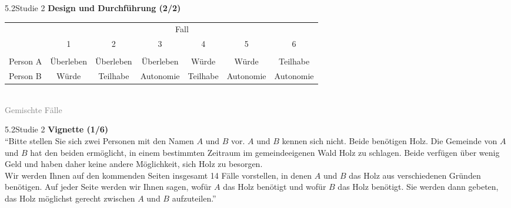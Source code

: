 \documentclass[xcolor=table,9pt,aspectratio=169]{beamer}
\begin{document}
\begin{frame}{\vspace*{10mm}5.2\hspace*{1em}Studie 2}
\textbf{Design und Durchführung (2/2)}\\
\medskip
\begin{center}
   \begin{tabular}{lcccccc}
      \arrayrulecolor{blue2}
      \hline
                 & \multicolumn{6}{c}{Fall}                                                         \\
                 & 1           & 2           & 3           & 4          & 5           & 6           \\
      \hline\hline\\[-0.5em]
      Person A   & Überleben   & Überleben   & Überleben   & Würde      & Würde       & Teilhabe    \\
      Person B   & Würde       & Teilhabe    & Autonomie   & Teilhabe   & Autonomie   & Autonomie   \\
      \hline
   \end{tabular}\\
   \smallskip
   \textcolor{gray}{Gemischte Fälle}
\end{center}
\end{frame}


\begin{frame}{\vspace*{10mm}5.2\hspace*{1em}Studie 2}
\textbf{Vignette (1/6)}\\
\medskip
\enquote{Bitte stellen Sie sich zwei Personen mit den Namen $A$ und $B$ vor. $A$ und $B$ kennen sich nicht. Beide benötigen Holz. Die Gemeinde von $A$ und $B$ hat den beiden ermöglicht, in einem bestimmten Zeitraum im gemeindeeigenen Wald Holz zu schlagen. Beide verfügen über wenig Geld und haben daher keine andere Möglichkeit, sich Holz zu besorgen.\\
\medskip
Wir werden Ihnen auf den kommenden Seiten insgesamt 14 Fälle vorstellen, in denen $A$ und $B$ das Holz aus verschiedenen Gründen benötigen. Auf jeder Seite werden wir Ihnen sagen, wofür $A$ das Holz benötigt und wofür $B$ das Holz benötigt. Sie werden dann gebeten, das Holz möglichst gerecht zwischen $A$ und $B$ aufzuteilen.}
\end{frame}
\end{document}
